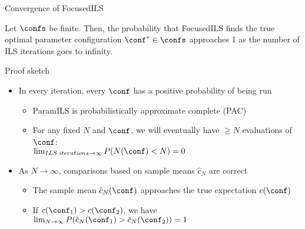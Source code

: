 \begin{frame}[c]{Convergence of FocusedILS}


%

\begin{theorem}
Let $\confs$ be finite. Then, the \alert{probability that FocusedILS finds the true 
optimal parameter configuration $\conf^* \in \confs$
approaches 1} as the number of ILS iterations goes to infinity.
\end{theorem}

\pause
\begin{block}{Proof sketch}
\begin{itemize}
  \item In every iteration, every $\conf$ has a positive probability of being run
  \begin{itemize}
    \item ParamILS is probabilistically approximate complete (PAC)
\pause
    \item For any fixed $N$ and $\conf$, \alert{we will eventually have $\ge N$ evaluations of $\conf$}:\\
     $\lim_{ILS\;iterations \rightarrow\infty} P(N(\conf) < N) = 0$
  \end{itemize}
\pause
  \item As $N \rightarrow \infty$, comparisons based on sample means $\hat{c}_N$ are correct 
\pause
  \begin{itemize}
	\item The \alert{sample mean $\hat{c}_N(\conf)$ approaches the true expectation $c(\conf)$}
\pause
	\item If $c(\conf_1) > c(\conf_2)$, we have $\lim_{N \rightarrow\infty} P(\hat{c}_N(\conf_1) > \hat{c}_N(\conf_2)) = 1$
  \end{itemize}
\end{itemize}
\end{block}


\end{frame}


